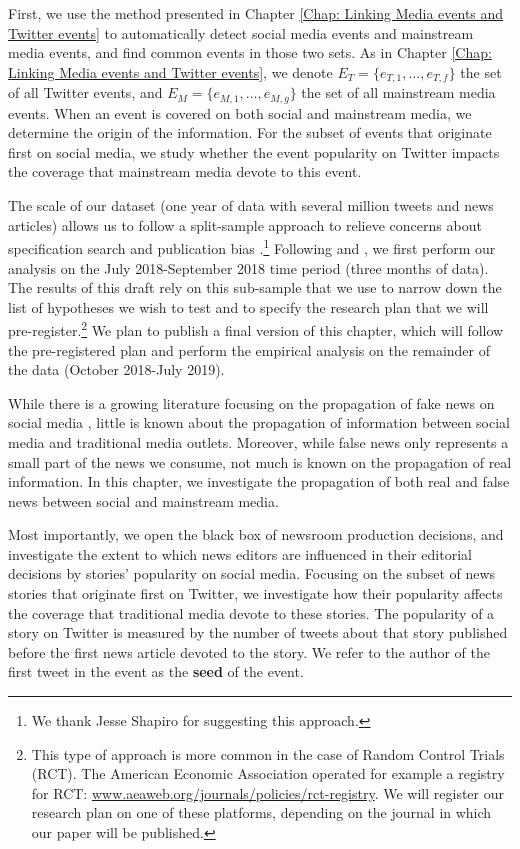 First, we use the method presented in Chapter \ref{Chap: Linking Media events and Twitter events} to automatically detect social media events and mainstream media events, and find common events in those two sets. As in Chapter \ref{Chap: Linking Media events and Twitter events}, we denote $E_T = \{e_{T,1},\ldots,e_{T,f}\}$ the set of all Twitter events, and $E_M = \{e_{M,1},\ldots,e_{M,g}\}$ the set of all mainstream media events. When an event is covered  on both social and mainstream media, we determine the origin of the information. For the subset of events that originate first on social media, we study whether the event popularity on Twitter impacts the coverage that mainstream media devote to this event.

The scale of our dataset (one year of data with several million tweets and news articles) allows us to follow a split-sample approach to relieve concerns about specification search and publication bias \citep{Leamer1978,Leamer1983,Glaeser2006_incentives}.\footnote{We thank Jesse Shapiro for suggesting this approach.} Following \citet{FafchampsLabonne2016,FafchampsLabonne2017} and \citet{AndersonMagruder2017}, we first perform our analysis on the July 2018-September 2018 time period (three months of data). The results of this draft rely on this sub-sample that we use to narrow down the list of hypotheses we wish to test and to specify the research plan that we will pre-register.\footnote{This type of approach is more common in the case of Random Control Trials (RCT). The American Economic Association operated for example a registry for RCT: \url{www.aeaweb.org/journals/policies/rct-registry}. We will register our research plan on one of these platforms, depending on the journal in which our paper will be published.} We plan to publish a final version of this chapter, which will follow the pre-registered plan and perform the empirical analysis on the remainder of the data (October 2018-July 2019).

While there is a growing literature focusing on the propagation of fake news on social media \citep{Vosoughietal2017,VosoughiRoyAral2018}, little is known about the propagation of information between social media and traditional media outlets. Moreover, while false news only represents a small part of the news we consume, not much is known on the propagation of real information. In this chapter, we investigate the propagation of both real and false news between social and mainstream media.

Most importantly, we open the black box of newsroom production decisions, and investigate the extent to which news editors are influenced in their editorial decisions by stories' popularity on social media. Focusing on the subset of news stories that originate first on Twitter, we investigate how their popularity affects the coverage that traditional media devote to these stories. The popularity of a story on Twitter is measured by the number of tweets about that story published before the first news article devoted to the story. We refer to the author of the first tweet in the event as the \textbf{seed} of the event.


